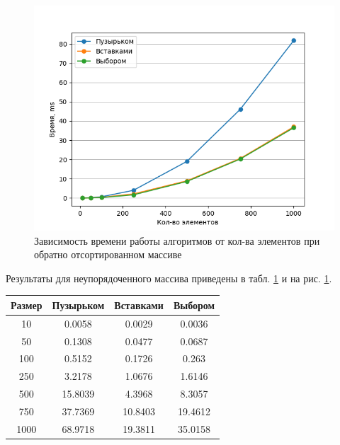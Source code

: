 \begin{figure}[!h]
	\centering
	\includegraphics[scale=0.9]{imgs/reverse.png}
	\caption{Зависимость времени работы алгоритмов от кол-ва элементов при обратно отсортированном массиве}
	\label{img:profiling-reverse}
\end{figure}
\newpage

Результаты для неупорядоченного массива приведены в табл. \ref{tab:profiling-rand} и на рис. \ref{tab:profiling-rand}.
\begin{table}[!ht]
	\begin{center}
		\begin{tabular}{|c|c|c|c|} 
			\hline
			Размер & Пузырьком & Вставками & Выбором \\  
			\hline
			10 & 0.0058 & 0.0029 & 0.0036 \\
			\hline
			50 & 0.1308 & 0.0477 & 0.0687 \\
			\hline
			100 & 0.5152 & 0.1726 & 0.263 \\
			\hline
			250 & 3.2178 & 1.0676 & 1.6146 \\
			\hline
			500 & 15.8039 & 4.3968 & 8.3057 \\
			\hline
			750 & 37.7369 & 10.8403 & 19.4612 \\
			\hline
			1000 & 68.9718 & 19.3811 & 35.0158 \\
			\hline
		\end{tabular}
		\label{tab:profiling-rand}
	\end{center}
\end{table}

